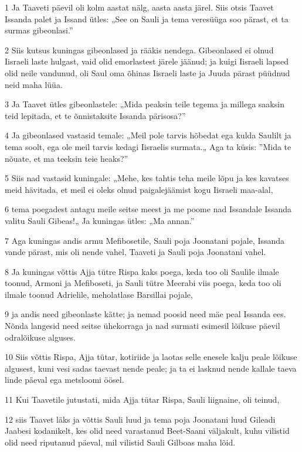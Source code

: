 \par 1 Ja Taaveti päevil oli kolm aastat nälg, aasta aasta järel. Siis otsis Taavet Issanda palet ja Issand ütles: „See on Sauli ja tema veresüüga soo pärast, et ta surmas gibeonlasi.”
\par 2 Siis kutsus kuningas gibeonlased ja rääkis nendega. Gibeonlased ei olnud Iisraeli laste hulgast, vaid olid emorlastest järele jäänud; ja kuigi Iisraeli lapsed olid neile vandunud, oli Saul oma õhinas Iisraeli laste ja Juuda pärast püüdnud neid maha lüüa.
\par 3 Ja Taavet ütles gibeonlastele: „Mida peaksin teile tegema ja millega saaksin teid lepitada, et te õnnistaksite Issanda pärisosa?”
\par 4 Ja gibeonlased vastasid temale: „Meil pole tarvis hõbedat ega kulda Saulilt ja tema soolt, ega ole meil tarvis kedagi Iisraelis surmata.„ Aga ta küsis: ”Mida te nõuate, et ma teeksin teie heaks?”
\par 5 Siis nad vastasid kuningale: „Mehe, kes tahtis teha meile lõpu ja kes kavatses meid hävitada, et meil ei oleks olnud paigalejäämist kogu Iisraeli maa-alal,
\par 6 tema poegadest antagu meile seitse meest ja me poome nad Issandale Issanda valitu Sauli Gibeas!„ Ja kuningas ütles: „Ma annan.”
\par 7 Aga kuningas andis armu Mefibosetile, Sauli poja Joonatani pojale, Issanda vande pärast, mis oli nende vahel, Taaveti ja Sauli poja Joonatani vahel.
\par 8 Ja kuningas võttis Ajja tütre Rispa kaks poega, keda too oli Saulile ilmale toonud, Armoni ja Mefiboseti, ja Sauli tütre Meerabi viis poega, keda too oli ilmale toonud Adrielile, meholatlase Barsillai pojale,
\par 9 ja andis need gibeonlaste kätte; ja nemad poosid need mäe peal Issanda ees. Nõnda langesid need seitse ühekorraga ja nad surmati esimesil lõikuse päevil odralõikuse alguses.
\par 10 Siis võttis Rispa, Ajja tütar, kotiriide ja laotas selle enesele kalju peale lõikuse algusest, kuni vesi sadas taevast nende peale; ja ta ei lasknud nende kallale taeva linde päeval ega metsloomi öösel.
\par 11 Kui Taavetile jutustati, mida Ajja tütar Rispa, Sauli liignaine, oli teinud,
\par 12 siis Taavet läks ja võttis Sauli luud ja tema poja Joonatani luud Gileadi Jaabesi kodanikelt, kes olid need varastanud Beet-Saani väljakult, kuhu vilistid olid need riputanud päeval, mil vilistid Sauli Gilboas maha lõid.
